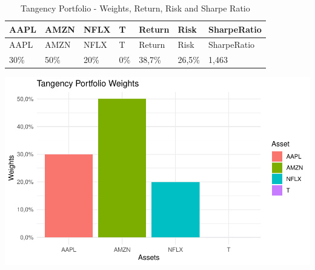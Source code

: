 \documentclass[
]{article}
\begin{document}
\begin{longtable}[]{@{}lllllll@{}}
\caption{Tangency Portfolio - Weights, Return, Risk and Sharpe
Ratio}\tabularnewline
\toprule()
AAPL & AMZN & NFLX & T & Return & Risk & SharpeRatio \\
\midrule()
\endfirsthead
\toprule()
AAPL & AMZN & NFLX & T & Return & Risk & SharpeRatio \\
\midrule()
\endhead
30\% & 50\% & 20\% & 0\% & 38,7\% & 26,5\% & 1,463 \\
\bottomrule()
\end{longtable}

\begin{center}\includegraphics{EfficientFrontier_files/figure-latex/plot Tangency Portfolio-1} \end{center}
\end{document}
